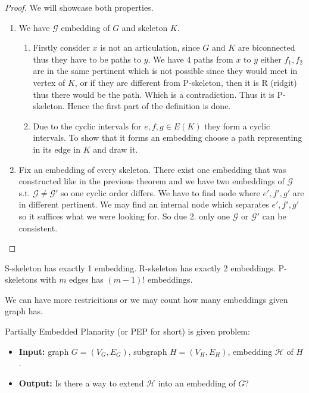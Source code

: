 \begin{proof}
	We will showcase both properties.
	
	\begin{enumerate}
		\item We have $\mathcal{G}$ embedding of $G$ and skeleton $K$.
		
		\begin{enumerate}
			\item Firstly consider $x$ is not an articulation, since $G$ and $K$ are biconnected thus they have to be paths to $y$. We have 4 paths from $x$ to $y$ either $f_1, f_2$ are in the same pertinent which is not possible since they would meet in vertex of $K$, or if they are different from P-skeleton, then it is R (ridgit) thus there would be the path. Which is a contradiction. Thus it is P-skeleton. Hence the first part of the definition is done.
			
			\item Due to the cyclic intervals for $e,f,g \in E(K)$ they form a cyclic intervals. To show that it forms an embedding choose a path representing in its edge in $K$ and draw it.
		\end{enumerate}
	
		\item Fix an embedding of every skeleton. There exist one embedding that was constructed like in the previous theorem and we have two embeddings of $\mathcal{G}$ s.t. $\mathcal{G} \neq \mathcal{G}'$ so one cyclic order differs. We have to find node where $e',f',g'$ are in different pertinent. We may find an internal node which separates $e',f',g'$ so it suffices what we were looking for. So due 2. only one $\mathcal{G}$ or $\mathcal{G}'$ can be consistent.
	\end{enumerate}
\end{proof}

\begin{note}
	S-skeleton has exactly 1 embedding. R-skeleton has exactly 2 embeddings. P-skeletons with $m$ edges has $(m-1)!$ embeddings.
\end{note}

\noindent We can have more restricitions or we may count how many embeddings given graph has.

\begin{example}
	Partially Embedded Planarity (or PEP for short) is given problem:
	
	\begin{itemize} []
		\item \textbf{Input:} graph $G = (V_G, E_G)$, subgraph $H = (V_H, E_H)$, embedding $\mathcal{H}$ of $H$.
		\item \textbf{Output:} Is there a way to extend $\mathcal{H}$ into an embedding of $G$?
	\end{itemize}
\end{example}

